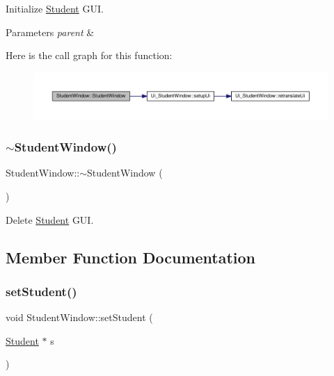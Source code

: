Initialize \hyperlink{class_student}{Student} G\+UI. 


\begin{DoxyParams}{Parameters}
{\em parent} & \\
\hline
\end{DoxyParams}
Here is the call graph for this function\+:
\nopagebreak
\begin{figure}[H]
\begin{center}
\leavevmode
\includegraphics[width=350pt]{class_student_window_a2b1c9c5068ba799d52fd308d2f4d615f_cgraph}
\end{center}
\end{figure}
\mbox{\label{class_student_window_ae22fb05936dfd5801fccba3873ad5eac}} 
\subsubsection{\texorpdfstring{$\sim$\+Student\+Window()}{~StudentWindow()}}
{\footnotesize\ttfamily Student\+Window\+::$\sim$\+Student\+Window (\begin{DoxyParamCaption}{ }\end{DoxyParamCaption})}



Delete \hyperlink{class_student}{Student} G\+UI. 



\subsection{Member Function Documentation}
\mbox{\label{class_student_window_ad413a2d54e47846392e75383e5ff8774}} 
\subsubsection{\texorpdfstring{set\+Student()}{setStudent()}}
{\footnotesize\ttfamily void Student\+Window\+::set\+Student (\begin{DoxyParamCaption}\item[{\hyperlink{class_student}{Student} $\ast$}]{s }\end{DoxyParamCaption})}



